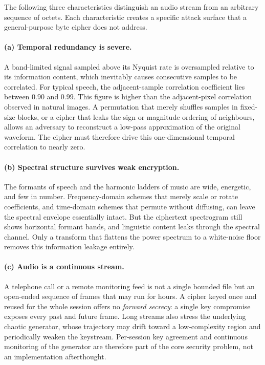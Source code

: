 \documentclass[pdflatex,sn-mathphys-num]{sn-jnl}%
\theoremstyle{thmstyleone}%
\theoremstyle{thmstyletwo}%
\theoremstyle{thmstylethree}%
\begin{document}
The following three characteristics distinguish an audio stream from an arbitrary sequence of octets. Each characteristic creates a specific attack surface that a general-purpose byte cipher does not address.

\paragraph{(a) Temporal redundancy is severe.}
A band-limited signal sampled above its Nyquist rate is oversampled relative to its information content, which inevitably causes consecutive samples to be correlated. For typical speech, the adjacent-sample correlation coefficient lies between $0.90$ and $0.99$. This figure is higher than the adjacent-pixel correlation observed in natural images. A permutation that merely shuffles samples in fixed-size blocks, or a cipher that leaks the sign or magnitude ordering of neighbours, allows an adversary to reconstruct a low-pass approximation of the original waveform. The cipher must therefore drive this one-dimensional temporal correlation to nearly zero.

\paragraph{(b) Spectral structure survives weak encryption.}
The formants of speech and the harmonic ladders of music are wide, energetic, and few in number. Frequency-domain schemes that merely scale or rotate coefficients, and time-domain schemes that permute without diffusing, can leave the spectral envelope essentially intact. But the ciphertext spectrogram still shows horizontal formant bands, and linguistic content leaks through the spectral channel. Only a transform that flattens the power spectrum to a white-noise floor removes this information leakage entirely.

\paragraph{(c) Audio is a continuous stream.}
A telephone call or a remote monitoring feed is not a single bounded file but an open-ended sequence of frames that may run for hours. A cipher keyed once and reused for the whole session offers no \emph{forward secrecy}: a single key compromise exposes every past and future frame. Long streams also stress the underlying chaotic generator, whose trajectory may drift toward a low-complexity region and periodically weaken the keystream. Per-session key agreement and continuous monitoring of the generator are therefore part of the core security problem, not an implementation afterthought.
\end{document}
